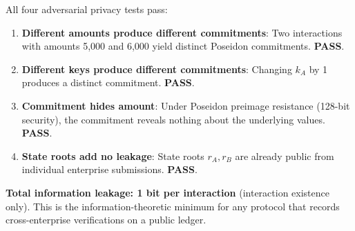 All four adversarial privacy tests pass:

\begin{enumerate}
\item \textbf{Different amounts produce different commitments}: Two
  interactions with amounts 5,000 and 6,000 yield distinct Poseidon
  commitments. \textbf{PASS}.
\item \textbf{Different keys produce different commitments}: Changing $k_A$
  by 1 produces a distinct commitment. \textbf{PASS}.
\item \textbf{Commitment hides amount}: Under Poseidon preimage resistance
  (128-bit security), the commitment reveals nothing about the underlying
  values. \textbf{PASS}.
\item \textbf{State roots add no leakage}: State roots $r_A, r_B$ are
  already public from individual enterprise submissions. \textbf{PASS}.
\end{enumerate}

\textbf{Total information leakage: 1 bit per interaction} (interaction
existence only). This is the information-theoretic minimum for any protocol
that records cross-enterprise verifications on a public ledger.
